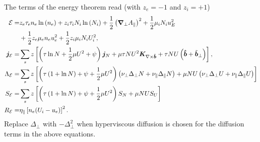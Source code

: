 The terms of the energy theorem read (with $z_e=-1$ and $z_i=+1$)
\begin{align} \label{eq:energy_conservation}
  \mathcal{E}= & z_e\tau_e n_e \ln{(n_e)} +z_i\tau_i N_i\ln{(N_i)}
  +\frac{1}{2}\left({\boldsymbol{\nabla}}_\perp A_\parallel\right)^2
   +  \frac{1}{2} \mu_i N_i u_E^2  \nonumber\\
   & +\frac{1}{2} z_e\mu_e  n_e u_e^2
  +\frac{1}{2} z_i\mu_i  N_i U_i^2,\\
  {\boldsymbol{j}}_{\mathcal E} =& \sum_s z\left[
  \left(\tau \ln N + \frac{1}{2}\mu U^2 + \psi \right) {\boldsymbol{j}}_N 
  + \mu \tau NU^2{\boldsymbol{K}}_{\nabla\times\bm{\hat{b}}} + \tau NU \left(\bm{\hat{b}} + \tilde{{\boldsymbol{b}}}_\perp\right)\right], \\
  \Lambda_{\mathcal E} =&  \sum_s z\left[\left( \tau\left( 1+\ln{N}\right) + \psi + \frac{1}{2} \mu U^2 \right)
  \left(\nu_\perp\Delta_\perp N + \nu_\parallel\Delta_\parallel N\right)  +  \mu NU\left(\nu_\perp\Delta_\perp U + \nu_\parallel\Delta_\parallel U\right) \right]
\nonumber \\
  S_{\mathcal E} =&  \sum_s  z\left[ \left(\tau\left( 1+\ln{N}\right) +\psi + \frac{1}{2} \mu U^2 \right)S_{N}  + \mu NU S_U\right]
\nonumber \\
  R_{\mathcal E} =&  \eta_\parallel  \left[ n_e(U_i-u_e)\right]^2.
\end{align}
Replace $\Delta_\perp$ with $-\Delta_\perp^2$ when hyperviscous diffusion is chosen
for the diffusion terms in the above equations.

